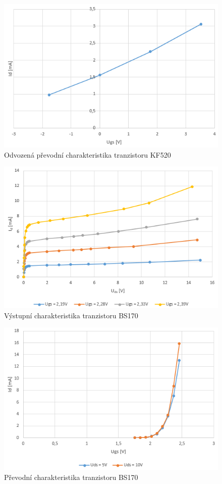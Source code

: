 \documentclass[12pt]{article} %
\begin{document}
\begin{figure}[H]
\center
\includegraphics[scale=0.8]{prevodni_kf520.png}
\caption{Odvozená převodní charakteristika tranzistoru KF520}
\end{figure}

\begin{figure}[H]
\center
\includegraphics[scale=0.9]{vystup_bs170.png}
\caption{Výstupní charakteristika tranzistoru BS170}
\end{figure}

\begin{figure}[H]
\center
\includegraphics[scale=0.9]{prevodni_bs170.png}
\caption{Převodní charakteristika tranzistoru BS170}
\end{figure}
\end{document}
